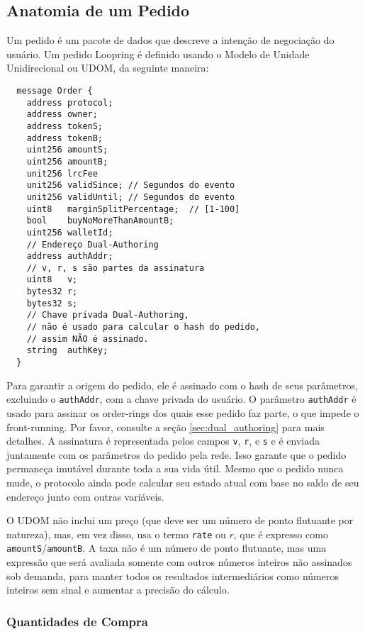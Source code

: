 \documentclass[UTF8,nofonts]{article}
\begin{document}
\begin{multicols}{2}
\subsection{Anatomia de um Pedido\label{anatomy}}
Um pedido é um pacote de dados que descreve a intenção de negociação do usuário. Um pedido Loopring é definido usando o Modelo de Unidade Unidirecional ou UDOM, da seguinte maneira:

\begin{verbatim}
  message Order {
    address protocol;
    address owner;
    address tokenS;
    address tokenB;
    uint256 amountS;
    uint256 amountB;
    unit256 lrcFee
    unit256 validSince; // Segundos do evento
    unit256 validUntil; // Segundos do evento
    uint8   marginSplitPercentage;  // [1-100]
    bool    buyNoMoreThanAmountB;
    uint256 walletId;
    // Endereço Dual-Authoring 
    address authAddr;
   	// v, r, s são partes da assinatura
    uint8   v;       
    bytes32 r;
    bytes32 s;
    // Chave privada Dual-Authoring,
    // não é usado para calcular o hash do pedido,
    // assim NÃO é assinado.
    string  authKey;          
  }
\end{verbatim}


Para garantir a origem do pedido, ele é assinado com o hash de seus parâmetros, excluindo o \verb|authAddr|, com a chave privada do usuário. O parâmetro \verb|authAddr| é usado para assinar os order-rings dos quais esse pedido faz parte, o que impede o front-running. Por favor, consulte a seção \ref{sec:dual_authoring} para mais detalhes. A assinatura é representada pelos campos \verb|v|, \verb|r|, e \verb|s| e é enviada juntamente com os parâmetros do pedido pela rede. Isso garante que o pedido permaneça imutável durante toda a sua vida útil. Mesmo que o pedido nunca mude, o protocolo ainda pode calcular seu estado atual com base no saldo de seu endereço junto com outras variáveis.



O UDOM não inclui um preço (que deve ser um número de ponto flutuante por natureza), mas, em vez disso, usa o termo \verb|rate| ou $r$, que é expresso como \verb|amountS|/\verb|amountB|. A taxa não é um número de ponto flutuante, mas uma expressão que será avaliada somente com outros números inteiros não assinados sob demanda, para manter todos os resultados intermediários como números inteiros sem sinal e aumentar a precisão do cálculo.

\subsubsection{Quantidades de Compra}



\end{multicols}
\end{document}
